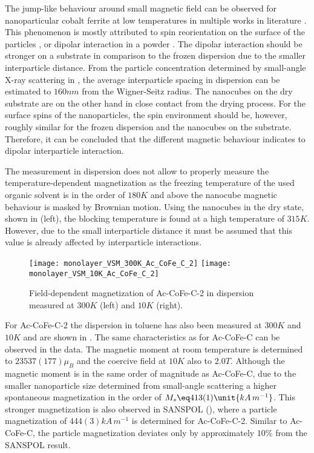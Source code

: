 \documentclass[\main/dresen_thesis.tex]{subfiles}
\begin{document}
  The jump-like behaviour around small magnetic field can be observed for nanoparticular cobalt ferrite at low temperatures in multiple works in literature \cite{Sathya_2016_Cofeo, Xu_2015_Simul, Alves_2017_Waspw, Geng_2016_Highm, Jung_2005_CoFe2, Fu_2012_Uniqu, Tirosh_2005_Optim}.
  This phenomenon is mostly attributed to spin reorientation on the surface of the particles \cite{Xu_2015_Simul, Fu_2012_Uniqu, Geng_2016_Highm}, or dipolar interaction in a powder \cite{Alves_2017_Waspw, Sathya_2016_Cofeo}.
  The dipolar interaction should be stronger on a substrate in comparison to the frozen dispersion due to the smaller interparticle distance.
  From the particle concentration determined by small-angle X-ray scattering in , the average interparticle spacing in dispersion can be estimated to $160 \unit{nm}$ from the Wigner-Seitz radius.
  The nanocubes on the dry substrate are on the other hand in close contact from the drying process.
  For the surface spins of the nanoparticles, the spin environment should be, however, roughly similar for the frozen dispersion and the nanocubes on the substrate.
  Therefore, it can be concluded that the different magnetic behaviour indicates to dipolar interparticle interaction.

  The measurement in dispersion does not allow to properly measure the temperature-dependent magnetization as the freezing temperature of the used organic solvent is in the order of $180 \unit{K}$ and above the nanocube magnetic behaviour is masked by Brownian motion.
  Using the nanocubes in the dry state, shown in  (left), the blocking temperature is found at a high temperature of $315 \unit{K}$.
  However, due to the small interparticle distance it must be assumed that this value is already affected by interparticle interactions.

  \begin{figure}[tb]
    \centering
    \texttt{[image: monolayer\_VSM\_300K\_Ac\_CoFe\_C\_2]}
    \texttt{[image: monolayer\_VSM\_10K\_Ac\_CoFe\_C\_2]}
    \caption{\label{fig:monolayers:nanoparticle:vsmAcCoFeC2}Field-dependent magnetization of Ac-CoFe-C-2 in dispersion measured at $300 \unit{K}$ (left) and $10 \unit{K}$ (right).}
  \end{figure}
  For Ac-CoFe-C-2 the dispersion in toluene has also been measured at $300 \unit{K}$ and $10 \unit{K}$ and are shown in .
  The same characteristics as for Ac-CoFe-C can be observed in the data.
  The magnetic moment at room temperature is determined to $23537(177) \mu_B$ and the coercive field at $10 \unit{K}$ also to $2.0 \unit{T}$.
  Although the magnetic moment is in the same order of magnitude as Ac-CoFe-C, due to the smaller nanoparticle size determined from small-angle scattering a higher spontaneous magnetization in the order of $M_s \eq 413(1) \unit{kA \, m^{-1}}$.
  This stronger magnetization is also observed in SANSPOL (), where a particle magnetization of $444(3) \unit{kA \, m^{-1}}$ is determined for Ac-CoFe-C-2.
  Similar to Ac-CoFe-C, the particle magnetization deviates only by approximately $10 \%$ from the SANSPOL result.
\end{document}
